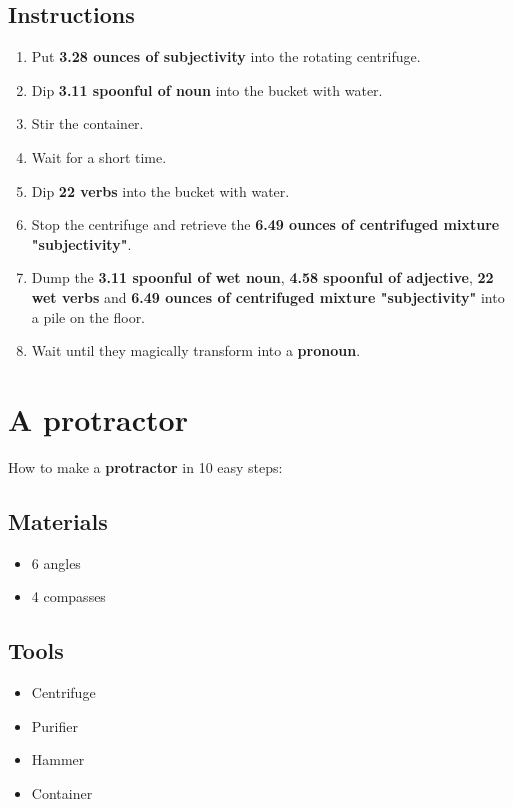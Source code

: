 \documentclass{article}
\begin{document}
\subsection{Instructions}\begin{enumerate}
\item 
Put \textbf{3.28 ounces of subjectivity} into the rotating centrifuge.
\item 
Dip \textbf{3.11 spoonful of noun} into the bucket with water.
\item 
Stir the container.
\item 
Wait for a short time.
\item 
Dip \textbf{22 verbs} into the bucket with water.
\item 
Stop the centrifuge and retrieve the \textbf{6.49 ounces of centrifuged mixture "subjectivity"}.
\item 
Dump the \textbf{3.11 spoonful of wet noun}, \textbf{4.58 spoonful of adjective}, \textbf{22 wet verbs} and \textbf{6.49 ounces of centrifuged mixture "subjectivity"} into a pile on the floor.
\item 
Wait until they magically transform into a \textbf{pronoun}.
\end{enumerate}
\newpage
\section{A protractor}How to make a \textbf{protractor} in 10 easy steps:

\subsection{Materials}\begin{itemize}
\item 
6 angles
\item 
4 compasses
\end{itemize}
\subsection{Tools}\begin{itemize}
\item 
Centrifuge
\item 
Purifier
\item 
Hammer
\item 
Container
\end{itemize}
\end{document}
